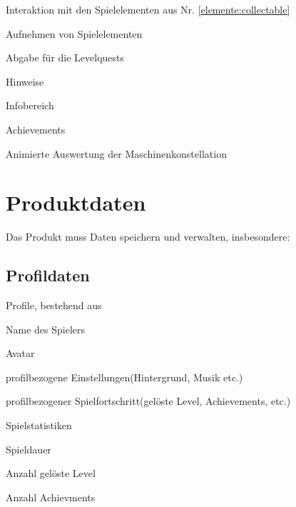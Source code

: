 \documentclass{scrartcl}
\begin{document}
\begin{falist}
\begin{falist}
		\item
	\end{falist}
	\item Interaktion mit den Spielelementen aus Nr. \ref{elemente:collectable}
	\begin{falist}
		\item Aufnehmen von Spielelementen
		\item Abgabe für die Levelquests
	\end{falist}
	\item Hinweise
	\item Infobereich
    \item Achievements
    \item Animierte Auswertung der Maschinenkonstellation
\end{falist}

\clearpage









\section{Produktdaten}
Das Produkt muss Daten speichern und verwalten, insbesondere: 

\subsection{Profildaten}

\begin{pdlist}
    \item Profile, bestehend aus 
    \begin{pdlist}
        \item Name des Spielers
        \item Avatar
        \item profilbezogene Einstellungen(Hintergrund, Musik etc.) 
        \item profilbezogener Spielfortschritt(gelöste Level, Achievements, etc.)
    \end{pdlist}
    \item Spielstatistiken
    \begin{pdlist}
        \item Spieldauer
        \item Anzahl gelöste Level
        \item Anzahl Achievments
    \end{pdlist}
\end{pdlist}
\end{document}
